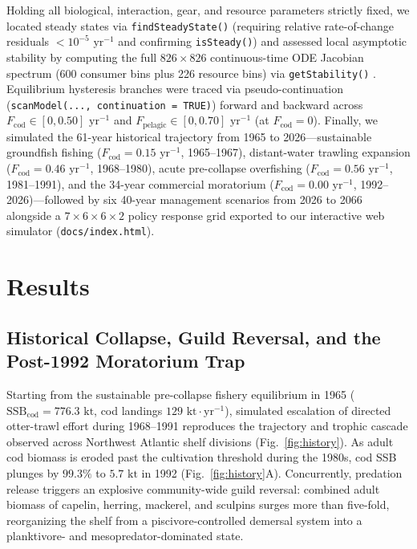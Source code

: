 \documentclass[11pt,letterpaper]{article}
\begin{document}
Holding all biological, interaction, gear, and resource parameters strictly fixed, we located steady states via \texttt{findSteadyState()} (requiring relative rate-of-change residuals $< 10^{-5}\text{ yr}^{-1}$ and confirming \texttt{isSteady()}) and assessed local asymptotic stability by computing the full $826 \times 826$ continuous-time ODE Jacobian spectrum (600 consumer bins plus 226 resource bins) via \texttt{getStability()} \citep{delius2022mizer}. Equilibrium hysteresis branches were traced via pseudo-continuation (\texttt{scanModel(..., continuation = TRUE)}) forward and backward across $F_{\mathrm{cod}} \in [0, 0.50]\text{ yr}^{-1}$ and $F_{\mathrm{pelagic}} \in [0, 0.70]\text{ yr}^{-1}$ (at $F_{\mathrm{cod}} = 0$). Finally, we simulated the 61-year historical trajectory from 1965 to 2026---sustainable groundfish fishing ($F_{\mathrm{cod}} = 0.15\text{ yr}^{-1}$, 1965--1967), distant-water trawling expansion ($F_{\mathrm{cod}} = 0.46\text{ yr}^{-1}$, 1968--1980), acute pre-collapse overfishing ($F_{\mathrm{cod}} = 0.56\text{ yr}^{-1}$, 1981--1991), and the 34-year commercial moratorium ($F_{\mathrm{cod}} = 0.00\text{ yr}^{-1}$, 1992--2026)---followed by six 40-year management scenarios from 2026 to 2066 alongside a $7 \times 6 \times 6 \times 2$ policy response grid exported to our interactive web simulator (\texttt{docs/index.html}).

\section{Results}

\subsection{Historical Collapse, Guild Reversal, and the Post-1992 Moratorium Trap}

Starting from the sustainable pre-collapse fishery equilibrium in 1965 ($\mathrm{SSB}_{\mathrm{cod}} = 776.3\text{ kt}$, cod landings $129\text{ kt}\cdot\text{yr}^{-1}$), simulated escalation of directed otter-trawl effort during 1968--1991 reproduces the trajectory and trophic cascade observed across Northwest Atlantic shelf divisions (Fig.~\ref{fig:history}). As adult cod biomass is eroded past the cultivation threshold during the 1980s, cod SSB plunges by $99.3\%$ to $5.7\text{ kt}$ in 1992 (Fig.~\ref{fig:history}A). Concurrently, predation release triggers an explosive community-wide guild reversal: combined adult biomass of capelin, herring, mackerel, and sculpins surges more than five-fold, reorganizing the shelf from a piscivore-controlled demersal system into a planktivore- and mesopredator-dominated state.
\end{document}
